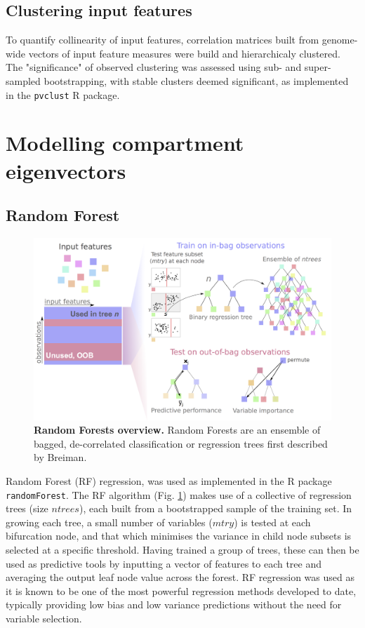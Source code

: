 \documentclass[a4paper,11pt,oneside]{book}
\begin{document}
\subsection{Clustering input features}

To quantify collinearity of input features, correlation matrices built from genome-wide vectors of input feature measures were build and hierarchicaly clustered. The "significance" of observed clustering was assessed using sub- and super-sampled bootstrapping, with stable clusters deemed significant, as implemented in the \texttt{pvclust} R package.\cite{Suzuki2006a}

\section{Modelling compartment eigenvectors}\label{modelling}

\subsection{Random Forest}\label{sec:rf}

\begin{figure}
\begin{center}
\includegraphics[width=4.5in]{figs/randforests.png}
\captionsetup{width=\textwidth}
\caption[Random Forests overview.]{ {\bf Random Forests overview. } 
 Random Forests are an ensemble of bagged, de-correlated classification or regression trees first described by Breiman.\cite{Breiman2001a}
}\label{fig:randforests}
\end{center}
\end{figure} 

Random Forest (RF) regression,\cite{Breiman2001a}  was used
as implemented in the R package \texttt{randomForest}.\cite{Liaw2002}
The RF algorithm (Fig. \ref{fig:randforests}) makes use of a collective of regression trees (size $ntrees$), each built from a
bootstrapped sample of the training set. In growing each tree, a small
number of variables ($mtry$) is tested at each bifurcation node, and that which minimises the
variance in child node subsets is selected at a specific
threshold. Having trained a group of trees, these can then be used as
predictive tools by inputting a vector of features to each tree and
averaging the output leaf node value across the forest. RF regression
was used as it is known to be one of the most powerful regression
methods developed to date,\cite{Svetnik2003, Cutler2007} typically
providing low bias and low variance predictions without the need for
variable selection.\cite{Diaz2006, Dasgupta2012}
\end{document}
